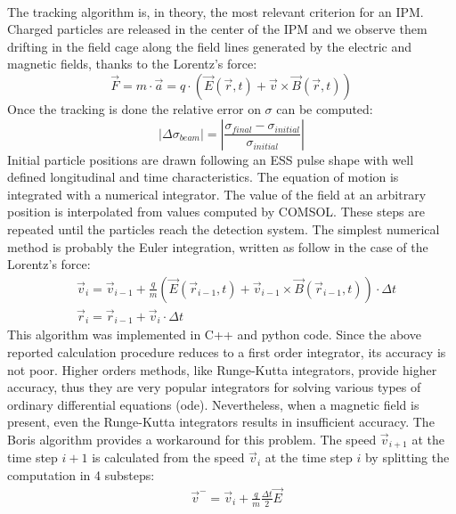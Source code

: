 \begin{refsection}
  \paragraph{}
  The tracking algorithm is, in theory, the most relevant criterion for an IPM. Charged particles are released in the center of the IPM and we observe them drifting in the field cage along the field lines generated by the electric and magnetic fields, thanks to the Lorentz’s force:
  \begin{equation}
    \vec{F} = m \cdot \vec{a} = q \cdot (\vec{E}(\vec{r},t) + \vec{v} \times \vec{B}(\vec{r},t))
  \end{equation}
  Once the tracking is done the relative error on $\sigma$ can be computed:
  \begin{equation}
    \left| \Delta \sigma_{beam} \right| = \left|\frac{\sigma_{final} - \sigma_{initial}}{\sigma_{initial}} \right|
  \end{equation}
  Initial particle positions are drawn following an ESS pulse shape with well defined longitudinal and time characteristics. The equation of motion is integrated with a numerical integrator. The value of the field at an arbitrary position is interpolated from values computed by COMSOL. These steps are repeated until the particles reach the detection system. The simplest numerical method is probably the Euler integration, written as follow in the case of the Lorentz’s force:
  \begin{align}
     & \vec{v}_{i} = \vec{v}_{i-1} + \frac{q}{m}(\vec{E}(\vec{r}_{i-1},t) + \vec{v}_{i-1} \times \vec{B}(\vec{r}_{i-1},t)) \cdot \Delta t \\
     & \vec{r}_{i} = \vec{r}_{i-1} + \vec{v}_{i} \cdot \Delta t
  \end{align}
  This algorithm was implemented in C++ and python code. Since the above reported calculation procedure reduces to a first order integrator, its accuracy is not poor. Higher orders methods, like Runge-Kutta integrators, provide higher accuracy, thus they are very popular integrators for solving various types of ordinary differential equations (\acrshort{ode}). Nevertheless, when a magnetic field is present, even the Runge-Kutta integrators results in insufficient accuracy.
  The Boris algorithm \cite{Boris1970} provides a workaround for this problem. The speed $\vec{v}_{i+1}$ at the time step $i+1$ is calculated from the speed $\vec{v}_{i}$ at the time step $i$ by splitting the computation in 4 substeps:
  \begin{align}
     & \vec{v}^{-} = \vec{v}_{i} + \frac{q}{m} \frac{\Delta t}{2}\vec{E}                                                                 \\

\end{align}
\end{refsection}
